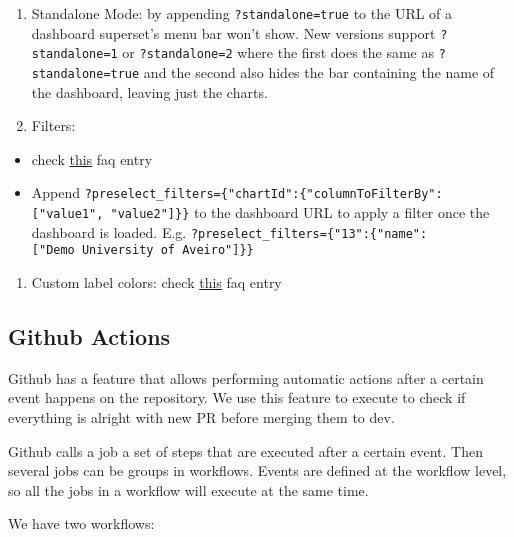 \documentclass[
]{book}
\providecommand{\tightlist}{%
  \setlength{\itemsep}{0pt}\setlength{\parskip}{0pt}}
\begin{document}
\begin{enumerate}
\def\labelenumi{\arabic{enumi}.}
\item
  Standalone Mode: by appending \texttt{?standalone=true} to the URL of a dashboard superset's menu bar won't show.
  New versions support \texttt{?standalone=1} or \texttt{?standalone=2} where the first does the same as \texttt{?standalone=true} and the second also hides the bar containing the name of the dashboard, leaving just the charts.
\item
  Filters:
\end{enumerate}

\begin{itemize}
\tightlist
\item
  check \href{https://superset.apache.org/docs/frequently-asked-questions\#how-to-add-dynamic-filters-to-a-dashboard}{this} faq entry
\item
  Append \texttt{?preselect\_filters=\{"chartId":\{"columnToFilterBy":{[}"value1",\ "value2"{]}\}\}} to the dashboard URL to apply a filter once the dashboard is loaded. E.g. \texttt{?preselect\_filters=\{"13":\{"name":{[}"Demo\ University\ of\ Aveiro"{]}\}\}}
\end{itemize}

\begin{enumerate}
\def\labelenumi{\arabic{enumi}.}
\setcounter{enumi}{2}
\tightlist
\item
  Custom label colors: check \href{https://superset.apache.org/docs/frequently-asked-questions\#is-there-a-way-to-force-the-use-specific-colors}{this} faq entry
\end{enumerate}

\hypertarget{github-actions}{%
\subsection*{Github Actions}\label{github-actions}}

Github has a feature that allows performing automatic actions after a certain event happens on the repository.
We use this feature to execute to check if everything is alright with new PR before merging them to dev.

Github calls a job a set of steps that are executed after a certain event.
Then several jobs can be groups in workflows.
Events are defined at the workflow level, so all the jobs in a workflow will execute at the same time.

We have two workflows:
\end{document}
